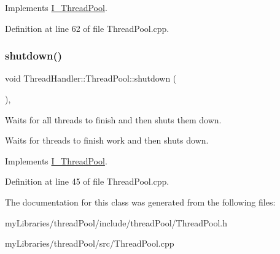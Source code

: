 Implements \mbox{\hyperlink{classI__ThreadPool}{I\+\_\+\+Thread\+Pool}}.



Definition at line 62 of file Thread\+Pool.\+cpp.

\mbox{\label{classThreadHandler_1_1ThreadPool_a302eb0a0297c64a23b12022e63be4da6}} 
\subsubsection{\texorpdfstring{shutdown()}{shutdown()}}
{\footnotesize\ttfamily void Thread\+Handler\+::\+Thread\+Pool\+::shutdown (\begin{DoxyParamCaption}{ }\end{DoxyParamCaption})\hspace{0.3cm}{\ttfamily [override]}, {\ttfamily [virtual]}}



Waits for all threads to finish and then shuts them down. 

Waits for threads to finish work and then shuts down. 

Implements \mbox{\hyperlink{classI__ThreadPool}{I\+\_\+\+Thread\+Pool}}.



Definition at line 45 of file Thread\+Pool.\+cpp.



The documentation for this class was generated from the following files\+:\begin{DoxyCompactItemize}
\item 
my\+Libraries/thread\+Pool/include/thread\+Pool/Thread\+Pool.\+h\item 
my\+Libraries/thread\+Pool/src/Thread\+Pool.\+cpp\end{DoxyCompactItemize}
